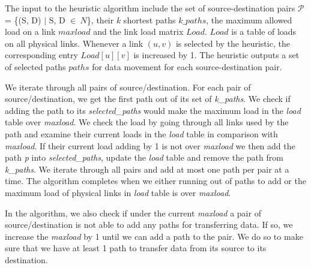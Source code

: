
The input to the heuristic algorithm include the set of source-destination pairs $\mathcal{P}$ = \{(S, D) $|$ S, D $\in~N$\}, their $k$ shortest paths {$k\_paths$}, the maximum allowed load on a link $maxload$ and the link load matrix $Load$. $Load$ is a table of loads on all physical links. Whenever a link $(u,v)$ is selected by the heuristic, the corresponding entry $Load[u][v]$ is increased by 1. The heuristic outputs a set of selected paths $paths$ for data movement for each source-destination pair. 

We iterate through all pairs of source/destination. For each pair of source/destination, we get the first path out of its set of \textit{k\_paths}. We check if adding the path to its \textit{selected\_paths} would make the maximum load in the \textit{load} table over \textit{maxload}. We check the load by going through all links used by the path and examine their current loads in the \textit{load} table in comparison with \textit{maxload}. If their current load adding by 1 is not over \textit{maxload} we then add the path \textit{p} into \textit{selected\_paths}, update the \textit{load} table and remove the path from \textit{k\_paths}. We iterate through all pairs and add at most one path per pair at a time. The algorithm completes when we either running out of paths to add or the maximum load of physical links in \textit{load} table is over \textit{maxload}.

In the algorithm, we also check if under the current \textit{maxload} a pair of source/destination is not able to add any paths for transferring data. If so, we increase the \textit{maxload} by 1 until we can add a path to the pair. We do so to make sure that we have at least 1 path to transfer data from its source to its destination.

